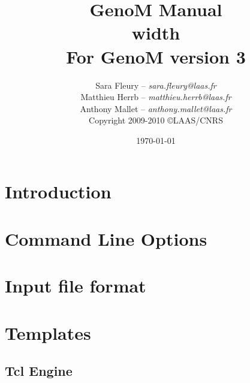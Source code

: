 \documentclass[a4paper,11pt]{book}
\title{\Huge GenoM Manual\\ \vrule height 2pt width \linewidth\\ \hfill\small For GenoM version 3}
\author{
   Sara Fleury -- {\em sara.fleury@laas.fr}\\
   Matthieu Herrb -- {\em matthieu.herrb@laas.fr}\\
   Anthony Mallet -- {\em anthony.mallet@laas.fr}\\[2em]
   Copyright 2009-2010 \copyright LAAS/CNRS
}
\date{\today}
\begin{document}

\frontmatter
\maketitle
\tableofcontents
\mainmatter

\chapter{Introduction}

\chapter{Command Line Options}
\label{chapter:clo}

\chapter{Input file format}
\label{chapter:iff}

\chapter{Templates}
\label{chapter:tmpl}

\section{Tcl Engine}
\label{section:tcl}

\end{document}
